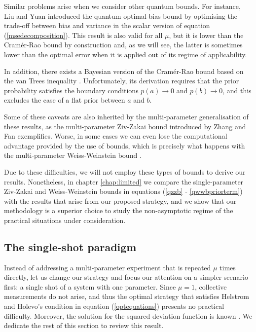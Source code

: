 Similar problems arise when we consider other quantum bounds. For instance, Liu and Yuan \cite{liu2016} introduced the quantum optimal-bias bound by optimising the trade-off between bias and variance in the scalar version of equation (\ref{msedecomposition}). This result is also valid for all $\mu$, but it is lower than the Cram\'{e}r-Rao bound by construction and, as we will see, the latter is sometimes lower than the optimal error when it is applied out of its regime of applicability. 

In addition, there exists a Bayesian version of the Cram\'{e}r-Rao bound based on the van Trees inequality \cite{gill1995}. Unfortunately, its derivation requires that the prior probability satisfies the boundary conditions $p(a) \rightarrow 0$ and $p(b) \rightarrow 0$, and this excludes the case of a flat prior between $a$ and $b$. 

Some of these caveats are also inherited by the multi-parameter generalisation of these results, as the multi-parameter Ziv-Zakai bound introduced by Zhang and Fan \cite{zhang2014} exemplifies. Worse, in some cases we can even lose the computational advantage provided by the use of bounds, which is precisely what happens with the multi-parameter Weiss-Weinstein bound \cite{tsang2016}. 

Due to these difficulties, we will not employ these types of bounds to derive our results. Nonetheless, in chapter \ref{chap:limited} we compare the single-parameter Ziv-Zakai and Weiss-Weinstein bounds in equations (\ref{qzzb} - \ref{qwwbpriorterm}) with the results that arise from our proposed strategy, and we show that our methodology is a superior choice to study the non-asymptotic regime of the practical situations under consideration. 

\subsection{The single-shot paradigm}
\label{subsec:singleshotparadigm}

Instead of addressing a multi-parameter experiment that is repeated $\mu$ times directly, let us change our strategy and focus our attention on a simpler scenario first: a single shot of a system with one parameter. Since $\mu = 1$, collective measurements do not arise, and thus the optimal strategy that satisfies Helstrom and Holevo's condition in equation (\ref{optequations}) presents no practical difficulty. Moreover, the solution for the squared deviation function is known \cite{personick1971, helstrom1976, macieszczak2014bayesian}. We dedicate the rest of this section to review this result. 


